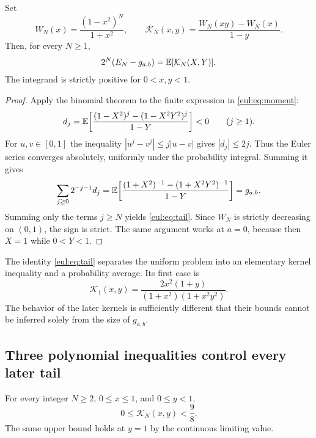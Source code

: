 \begin{lemma}\label{eul:lem:tail}
Set
\begin{equation}\label{eul:eq:W-K}
 W_N(x)=\frac{(1-x^2)^N}{1+x^2},\qquad
 \mathcal K_N(x,y)=\frac{W_N(xy)-W_N(x)}{1-y}.
\end{equation}
Then, for every $N\ge1$,
\begin{equation}\label{eul:eq:tail}
 2^N(E_N-g_{a,b})=\mathbb E[\mathcal K_N(X,Y)].
\end{equation}
The integrand is strictly positive for $0<x,y<1$.
\end{lemma}
\begin{proof}
Apply the binomial theorem to the finite expression in
\eqref{eul:eq:moment}:
\begin{equation}\label{eul:eq:negative-increments}
 d_j=\mathbb E\!\left[
 \frac{(1-X^2)^j-(1-X^2Y^2)^j}{1-Y}\right]<0\qquad(j\ge1).
\end{equation}
For $u,v\in[0,1]$ the inequality $|u^j-v^j|\le j|u-v|$ gives
$|d_j|\le2j$. Thus the Euler series converges absolutely, uniformly
under the probability integral. Summing it gives
\[
 \sum_{j\ge0}2^{-j-1}d_j
 =\mathbb E\!\left[\frac{(1+X^2)^{-1}-(1+X^2Y^2)^{-1}}{1-Y}\right]
 =g_{a,b}.
\]
Summing only the terms $j\ge N$ yields \eqref{eul:eq:tail}. Since
$W_N$ is strictly decreasing on $(0,1)$, the sign is strict. The same
argument works at $a=0$, because then $X=1$ while $0<Y<1$.
\end{proof}

The identity \eqref{eul:eq:tail} separates the uniform problem into
an elementary kernel inequality and a probability average. Its first
case is
\begin{equation}\label{eul:eq:K1}
 \mathcal K_1(x,y)=
 \frac{2x^2(1+y)}{(1+x^2)(1+x^2y^2)}.
\end{equation}
The behavior of the later kernels is sufficiently different that
their bounds cannot be inferred solely from the size of $g_{a,b}$.

\subsection{Three polynomial inequalities control every later tail}

\begin{lemma}\label{eul:lem:kernel-gap}
For every integer $N\ge2$, $0\le x\le1$, and $0\le y<1$,
\begin{equation}\label{eul:eq:kernel-gap}
 0\le\mathcal K_N(x,y)<\frac98.
\end{equation}
The same upper bound holds at $y=1$ by the continuous limiting value.
\end{lemma}

